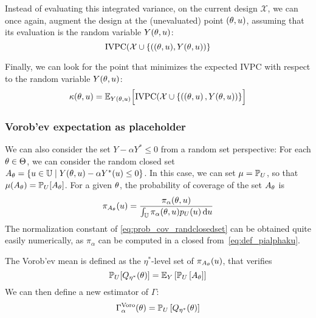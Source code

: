 \documentclass[../../Main_ManuscritThese.tex]{subfiles}
\begin{document}
Instead of evaluating this integrated variance, on the current design $\mathcal{X}$, we can once again, augment the design at the (unevaluated) point $(\theta, u)$, assuming that its evaluation is the random variable $Y(\theta, u)$:
\begin{equation}
  \mathrm{IVPC}(\mathcal{X} \cup \{((\theta, u), Y(\theta, u))\}
\end{equation}

Finally, we can look for the point that minimizes the expected $\mathrm{IVPC}$ with respect to the random variable $Y(\theta, u)$:
\begin{equation}
  \kappa(\theta, u) = \mathbb{E}_{Y(\theta, u)}\Big[\mathrm{IVPC}(\mathcal{X} \cup \{   \left(\left(\theta, u \right), Y(\theta, u) \right)  \}     \Big]
\end{equation}

\subsubsection{Vorob'ev expectation as placeholder}
We can also consider the set $Y - \alpha Y^* \leq 0$ from a random set perspective:
For each $\theta\in\Theta$, we can consider the random closed set $A_\theta =  \{u \in \mathbb{U} \mid Y(\theta, u) - \alpha Y^*(u) \leq 0\}$.
In this case, we can set $\mu = \mathbb{P}_{U}$, so that $\mu(A_{\theta}) = \mathbb{P}_{U}[A_{\theta}]$.
For a given $\theta$, the probability of coverage of the set $A_{\theta}$
is
\begin{equation}
  \label{eq:prob_cov_randclosedset}
  \pi_{A_{\theta}}(u) = \frac{\pi_{\alpha}(\theta, u)}{\int_{\mathbb{U}} \pi_{\alpha}(\theta, u)p_{U}(u)\,\mathrm{d}u}
\end{equation}
The normalization constant of \cref{eq:prob_cov_randclosedset} can be obtained quite easily numerically, as $\pi_{\alpha}$ can be computed in a closed from~\cref{eq:def_pialphaku}.

The Vorob'ev mean is defined as the $\eta^*$-level set of $\pi_{A_\theta}(u)$, that verifies
\begin{equation}
  \Prob_{\UU}[Q_{\eta^*}(\kk)] = \Ex_{Y}\left[\Prob_{\UU}\left[A_{\kk}\right]\right] %
\end{equation}
We can then define a new estimator of $\Gamma$:
\begin{equation}
  \Gamma_{\alpha}^{\mathrm{Voro}}(\theta) = \mathbb{P}_{U}\left[Q_{\eta^*}(\theta)\right]
\end{equation}
\end{document}
